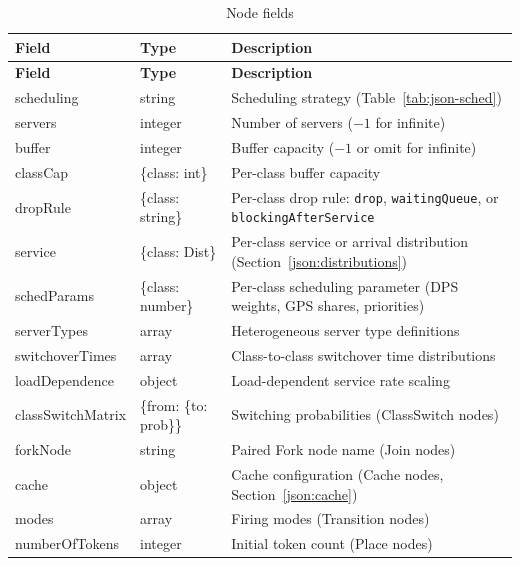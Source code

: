 \begin{footnotesize}
\begin{longtable}{|T{2.8cm}|T{3.5cm}|D{6.6cm}|}
\caption{Node fields}\label{tab:json-nodefields}
\\\hline
\textbf{Field} & \textbf{Type} & \textbf{Description} \\\hline
\endfirsthead
\hline \textbf{Field} & \textbf{Type} & \textbf{Description} \\\hline
\endhead
\hline
\endfoot
scheduling  & string & Scheduling strategy (Table~\ref{tab:json-sched}) \\\hline
servers     & integer & Number of servers ($-1$ for infinite) \\\hline
buffer      & integer & Buffer capacity ($-1$ or omit for infinite) \\\hline
classCap    & \{class: int\} & Per-class buffer capacity \\\hline
dropRule    & \{class: string\} & Per-class drop rule: \texttt{drop}, \texttt{waitingQueue}, or \texttt{blockingAfterService} \\\hline
service     & \{class: Dist\} & Per-class service or arrival distribution (Section~\ref{json:distributions}) \\\hline
schedParams & \{class: number\} & Per-class scheduling parameter (DPS weights, GPS shares, priorities) \\\hline
serverTypes & array & Heterogeneous server type definitions \\\hline
switchoverTimes & array & Class-to-class switchover time distributions \\\hline
loadDependence & object & Load-dependent service rate scaling \\\hline
classSwitchMatrix & \{from: \{to: prob\}\} & Switching probabilities (ClassSwitch nodes) \\\hline
forkNode & string & Paired Fork node name (Join nodes) \\\hline
cache   & object & Cache configuration (Cache nodes, Section~\ref{json:cache}) \\\hline
modes   & array & Firing modes (Transition nodes) \\\hline
numberOfTokens & integer & Initial token count (Place nodes) \\\hline
\end{longtable}
\end{footnotesize}


